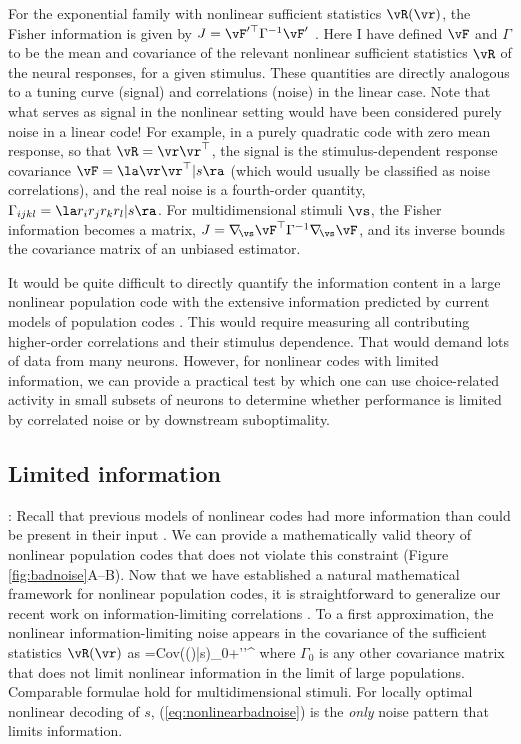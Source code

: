 \documentclass[11pt,twocolumn]{article}
\begin{document}
For the exponential family with nonlinear sufficient statistics $\vR(\vr)$, the Fisher information is given by $J=\vF'^\top\Gamma^{-1}\vF'$ \cite{beck2011insights}. Here I have defined $\vF$ and $\Gamma$ to be the mean and covariance of the relevant nonlinear sufficient statistics $\vR$ of the neural responses, for a given stimulus. These quantities are directly analogous to a tuning curve (signal) and correlations (noise) in the linear case. Note that what serves as signal in the nonlinear setting would have been considered purely noise in a linear code! For example, in a purely quadratic code with zero mean response, so that $\vR=\vr\vr^\top$, the signal is the stimulus-dependent response covariance $\vF=\la\vr\vr^\top|s\ra$ (which would usually be classified as noise correlations), and the real noise is a fourth-order quantity, $\Gamma_{ijkl}=\la r_ir_jr_kr_l|s\ra$. For multidimensional stimuli $\vs$, the Fisher information becomes a matrix, $J=\nabla_{\!\vs}\vF^\top\Gamma^{-1}\nabla_{\!\vs}\vF$, and its inverse bounds the covariance matrix of an unbiased estimator.

It would be quite difficult to directly quantify the information content in a large nonlinear population code with the extensive information predicted by current models of population codes \cite{shamir2006implications,ecker2011effect,josic2009stimulus}. This would require measuring all contributing higher-order correlations and their stimulus dependence. That would demand lots of data from many neurons. However, for nonlinear codes with limited information, we can provide a practical test by which one can use choice-related activity in small subsets of neurons to determine whether performance is limited by correlated noise or by downstream suboptimality.


\subsection{Limited information}: Recall that previous models of nonlinear codes had more information than could be present in their input \cite{shamir2006implications,ecker2011effect,josic2009stimulus}. We can provide a mathematically valid theory of nonlinear population codes that does not violate this constraint (Figure \ref{fig:badnoise}A--B). Now that we have established a natural mathematical framework for nonlinear population codes, it is straightforward to generalize our recent work on information-limiting correlations \cite{moreno:2014information}. To a first approximation, the nonlinear information-limiting noise appears in the covariance of the sufficient statistics $\vR(\vr)$ as
\be
\Gamma={\rm Cov}(\vR(\vr)|s)\approx\Gamma_0+\epsilon\vF'\vF'^\top
\label{eq:nonlinearbadnoise}
\ee
where $\Gamma_0$ is any other covariance matrix that does not limit nonlinear information in the limit of large populations. Comparable formulae hold for multidimensional stimuli. For locally optimal nonlinear decoding of $s$, (\ref{eq:nonlinearbadnoise}) is the {\it only} noise pattern that limits information.
\end{document}
